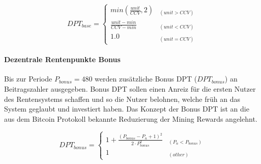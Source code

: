 \begin{equation}
DPT_{base} = \begin{cases} 
min(\frac{unit} {CCV}, 2) 
  & _{(unit > CCV)} \\
\frac{unit - min} {CCV - min} 
  & _{(unit < CCV)} \\
1.0 & _{(unit = CCV)}
\end{cases}
\end{equation}

\paragraph*{Dezentrale Rentenpunkte Bonus}
Bis zur Periode $P_{bonus} = 480$ werden zusätzliche Bonus DPT 
($DPT_{bonus}$) an
Beitragszahler ausgegeben. Bonus DPT sollen einen Anreiz für
die ersten Nutzer des Rentensystems schaffen und so die Nutzer belohnen, 
welche früh an das System geglaubt und investiert haben. Das Konzept der Bonus DPT
ist an die aus dem Bitcoin Protokoll bekannte Reduzierung der Mining Rewards angelehnt.

\begin{equation}
DPT_{bonus} = \begin{cases} 
1 + \frac{(P_{bonus} - P_{n} + 1)^2}
      {2 \cdot P_{bonus}^2} & _{(P_{n} < P_{bonus})} \\
1 & _{(other)} 
\end{cases}
\end{equation}


